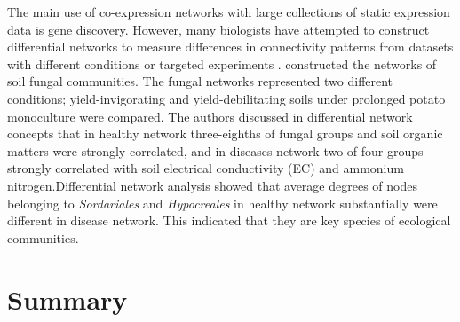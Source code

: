 The main use of co-expression networks with large collections of static expression data is gene discovery. However, many biologists have attempted to construct differential networks to measure differences in connectivity patterns from datasets with different conditions or targeted experiments .  constructed the networks of soil fungal communities. The fungal networks represented two different conditions; yield-invigorating and yield-debilitating soils under prolonged potato monoculture were compared. The authors discussed in differential network concepts that in healthy network three-eighths of fungal groups and soil organic matters were strongly correlated, and in diseases network two of four groups strongly correlated with soil electrical conductivity (EC) and ammonium nitrogen.Differential network analysis showed that average degrees of nodes belonging to \textit{Sordariales} and \textit{Hypocreales} in healthy network substantially were different in disease network. This indicated that they are key species of ecological communities.

\section*{Summary}

